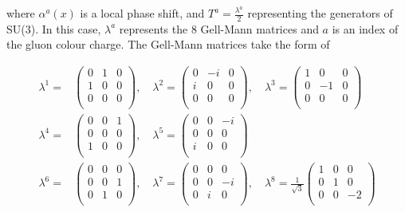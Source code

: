 \documentclass[12pt,a4paper,epsf,portrait,times,epsfig]{report}
\begin{document}
	where $\alpha^{a}(x)$ is a local phase shift, and $T^{a} = \frac{\lambda^{a}}{2}$ representing the generators of SU(3). In this case, $\lambda^{a}$ represents the 8 Gell-Mann matrices and $a$ is an index of the gluon colour charge. The Gell-Mann matrices take the form of
	
	\begin{equation}
		\begin{split}
			\lambda^{1}=&\begin{pmatrix}
				0 & 1 & 0 \\
				1 & 0 & 0 \\
				0 & 0 & 0 \\
			\end{pmatrix},\quad
			\lambda^{2}=\begin{pmatrix}
				0 & -i & 0 \\
				i & 0 & 0 \\
				0 & 0 & 0 \\
			\end{pmatrix},\quad
			\lambda^{3}=\begin{pmatrix}
				1 & 0 & 0 \\
				0 & -1 & 0 \\
				0 & 0 & 0 \\
			\end{pmatrix} \\
			\lambda^{4}=&\begin{pmatrix}
				0 & 0 & 1 \\
				0 & 0 & 0 \\
				1 & 0 & 0 \\
			\end{pmatrix},\quad
			\lambda^{5}=\begin{pmatrix}
				0 & 0 & -i \\
				0 & 0 & 0 \\
				i & 0 & 0 \\
			\end{pmatrix} \\
			\lambda^{6}=&\begin{pmatrix}
				0 & 0 & 0 \\
				0 & 0 & 1 \\
				0 & 1 & 0 \\
			\end{pmatrix},\quad
			\lambda^{7}=\begin{pmatrix}
				0 & 0 & 0 \\
				0 & 0 & -i \\
				0 & i & 0 \\
			\end{pmatrix},\quad
			\lambda^{8}=\frac{1}{\sqrt{3}}\begin{pmatrix}
				1 & 0 & 0 \\
				0 & 1 & 0 \\
				0 & 0 & -2 \\
			\end{pmatrix} \\
		\end{split}
	\end{equation}
\end{document}
